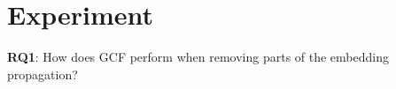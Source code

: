 \section{Experiment}
\textbf{RQ1}: How does GCF perform when removing parts of the embedding propagation?




